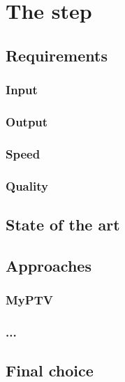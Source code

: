 \chapter{The \linkDDD* step}
\label{chap:3dlink}

\section{Requirements}

\subsection{Input}

\subsection{Output}

\subsection{Speed}

\subsection{Quality}

\section{State of the art}

\section{Approaches}

\subsection{MyPTV}

\subsection{...}

\section{Final choice}
